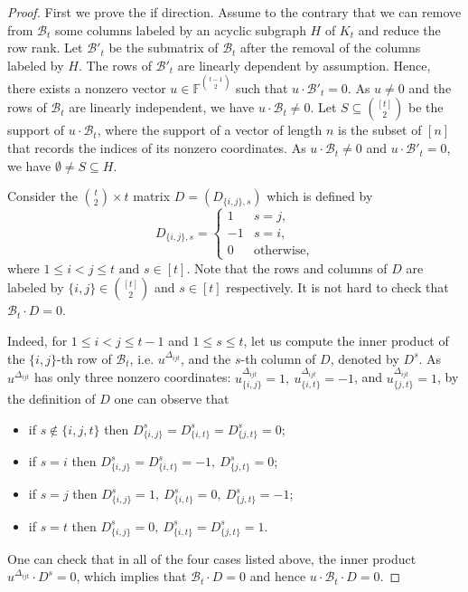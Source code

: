\documentclass[11pt]{article}
\newcommand\black[1]{{\color{black} #1}}
\begin{document}
\begin{proof}
First we prove the if direction.
Assume to the contrary that we can remove from  $\mathcal{B}_t$ some columns labeled by an acyclic subgraph $H$ of $K_t$ and reduce the row rank.
Let $\mathcal{B}'_t$ be the submatrix of $\mathcal{B}_t$ after the removal of the columns labeled by  $H$. The rows of   $\mathcal{B}'_t$ are linearly dependent by assumption. Hence, there exists a nonzero vector $u\in\mathbb{F}^{\binom{t-1}{2}}$ such that $u\cdot\mathcal{B}'_t=0$. As $u\neq 0$ and the rows of $\mathcal{B}_t$ are linearly independent, we have $u\cdot\mathcal{B}_t\neq 0$. Let $S\subseteq \binom{[t]}{2}$ be the support of $u\cdot\mathcal{B}_t$, where the support of a vector of length $n$ is the subset of $[n]$ that records the indices of its nonzero coordinates. As $u\cdot\mathcal{B}_t\neq 0$ and $u\cdot\mathcal{B}'_t=0$, we have $\emptyset\neq S\subseteq H$.

Consider the  $\binom{t}{2}\times t$ matrix $D=(D_{\{i,j\},s})$
which is defined   by
\[
D_{\{i,j\},s}=\begin{cases}
1 & s=j, \\
-1 & s=i, \\
0 & \text{otherwise},
\end{cases}
\]
where  $1\leq i<j\leq t \text{ and } s\in [t]$. Note that the rows and columns of $D$ are  labeled by $\{i,j\}\in \binom{[t]}{2}$
and  $s\in [t]$ respectively. It is not hard to check that $\mathcal{B}_t\cdot D=0$. \black{Indeed, for $1\le i<j\le t-1$ and $1\le s\le t$, let us compute the inner product of the $\{i,j\}$-th row of $\mathcal{B}_t$, i.e. $u^{\Delta_{ijt}}$, and the $s$-th column of $D$, denoted by $D^s$. As $u^{\Delta_{ijt}}$ has only three nonzero coordinates: $u^{\Delta_{ijt}}_{\{i,j\}}=1,~u^{\Delta_{ijt}}_{\{i,t\}}=-1$, and $u^{\Delta_{ijt}}_{\{j,t\}}=1$, by the definition of $D$ one can observe that
\begin{itemize}
    \item [(i)] if $s\not\in\{i,j,t\}$ then $D^s_{\{i,j\}}=D^s_{\{i,t\}}=D^s_{\{j,t\}}=0$;
    \item [(ii)] if $s=i$ then $D^s_{\{i,j\}}=D^s_{\{i,t\}}=-1,~D^s_{\{j,t\}}=0$;
    \item [(iii)]  if $s=j$ then $D^s_{\{i,j\}}=1,~D^s_{\{i,t\}}=0,~D^s_{\{j,t\}}=-1$;
    \item [(iv)] if $s=t$ then $D^s_{\{i,j\}}=0,~D^s_{\{i,t\}}=D^s_{\{j,t\}}=1$.
\end{itemize}
One can check that in all of the four cases listed above, the inner product $u^{\Delta_{ijt}}\cdot D^s=0$, which implies that $\mathcal{B}_t\cdot D=0$ and hence $u\cdot \mathcal{B}_t\cdot D=0$.}


\end{proof}
\end{document}
